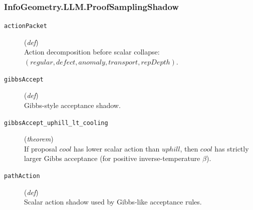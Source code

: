\documentclass[11pt,a4paper]{article}
\begin{document}
\subsubsection*{InfoGeometry.LLM.ProofSamplingShadow}
\begin{description}
  \item[\texttt{actionPacket}] (\textit{def}) \\ Action decomposition before scalar collapse: 
$(regular, defect, anomaly, transport, repDepth)$.
  \item[\texttt{gibbsAccept}] (\textit{def}) \\ Gibbs-style acceptance shadow.
  \item[\texttt{gibbsAccept\_uphill\_lt\_cooling}] (\textit{theorem}) \\ If proposal $cool$ has lower scalar action than $uphill$, then $cool$ has 
strictly larger Gibbs acceptance (for positive inverse-temperature $\beta $).
  \item[\texttt{pathAction}] (\textit{def}) \\ Scalar action shadow used by Gibbs-like acceptance rules.
\end{description}
\end{document}
